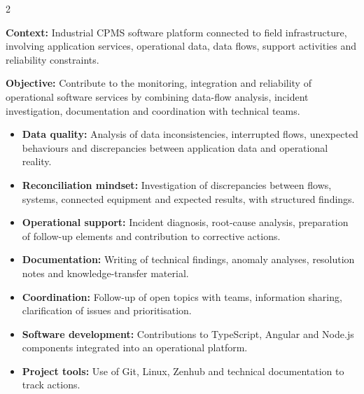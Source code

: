 \documentclass[8pt,a4paper,ragged2e,withhyper]{altacv}
\begin{document}



\makecvheader
\vspace{-0.3cm}


\begin{paracol}{2}



\textbf{Context:} Industrial CPMS software platform connected to field infrastructure, involving application services, operational data, data flows, support activities and reliability constraints.

\textbf{Objective:} Contribute to the monitoring, integration and reliability of operational software services by combining data-flow analysis, incident investigation, documentation and coordination with technical teams.

\begin{itemize}
  \item \textbf{Data quality:} Analysis of data inconsistencies, interrupted flows, unexpected behaviours and discrepancies between application data and operational reality.
  \item \textbf{Reconciliation mindset:} Investigation of discrepancies between flows, systems, connected equipment and expected results, with structured findings.
  \item \textbf{Operational support:} Incident diagnosis, root-cause analysis, preparation of follow-up elements and contribution to corrective actions.
  \item \textbf{Documentation:} Writing of technical findings, anomaly analyses, resolution notes and knowledge-transfer material.
  \item \textbf{Coordination:} Follow-up of open topics with teams, information sharing, clarification of issues and prioritisation.
  \item \textbf{Software development:} Contributions to TypeScript, Angular and Node.js components integrated into an operational platform.
  \item \textbf{Project tools:} Use of Git, Linux, Zenhub and technical documentation to track actions.
\end{itemize}


\end{paracol}
\end{document}
